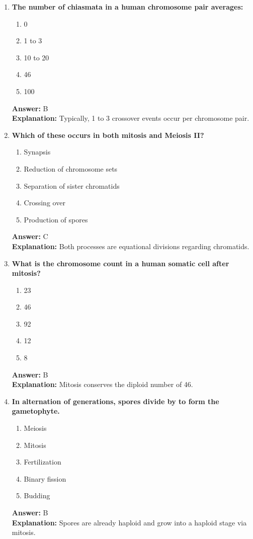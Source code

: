 \documentclass[11pt, a4paper]{article}
\begin{document}
\begin{enumerate}[leftmargin=*, label=\arabic*.]
\item \textbf{The number of chiasmata in a human chromosome pair averages:}
\begin{enumerate}[label=\Alph*.]
\item 0
\item 1 to 3
\item 10 to 20
\item 46
\item 100
\end{enumerate}
\textbf{Answer:} B \\
\textbf{Explanation:} Typically, 1 to 3 crossover events occur per chromosome pair.

\item \textbf{Which of these occurs in both mitosis and Meiosis II?}
\begin{enumerate}[label=\Alph*.]
\item Synapsis
\item Reduction of chromosome sets
\item Separation of sister chromatids
\item Crossing over
\item Production of spores
\end{enumerate}
\textbf{Answer:} C \\
\textbf{Explanation:} Both processes are equational divisions regarding chromatids.

\item \textbf{What is the chromosome count in a human somatic cell after mitosis?}
\begin{enumerate}[label=\Alph*.]
\item 23
\item 46
\item 92
\item 12
\item 8
\end{enumerate}
\textbf{Answer:} B \\
\textbf{Explanation:} Mitosis conserves the diploid number of 46.

\item \textbf{In alternation of generations, spores divide by \underline{\hspace{1cm}} to form the gametophyte.}
\begin{enumerate}[label=\Alph*.]
\item Meiosis
\item Mitosis
\item Fertilization
\item Binary fission
\item Budding
\end{enumerate}
\textbf{Answer:} B \\
\textbf{Explanation:} Spores are already haploid and grow into a haploid stage via mitosis.


\end{enumerate}
\end{document}

